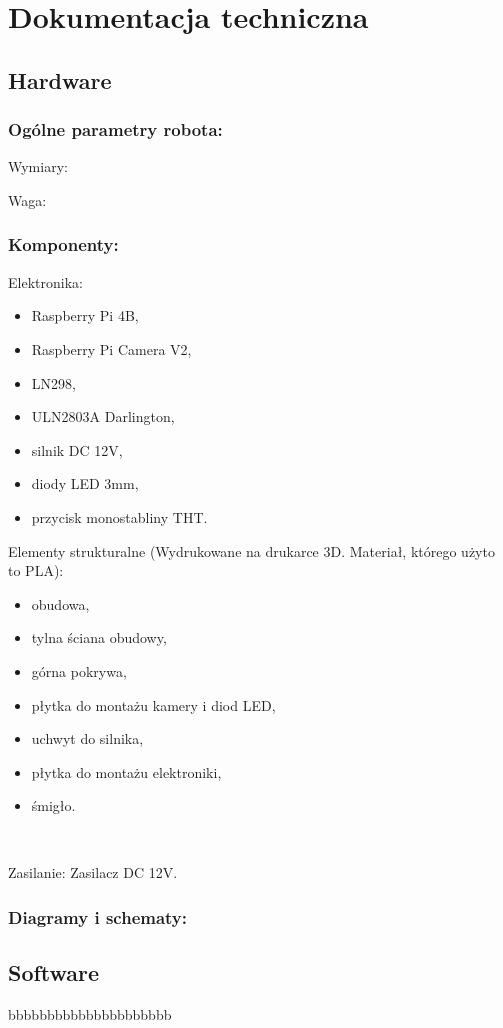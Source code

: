 \section{Dokumentacja techniczna}
\subsection{Hardware}
\subsubsection{Ogólne parametry robota:}
Wymiary: 

Waga:

\subsubsection{Komponenty:}
Elektronika:
    \begin{itemize}
        \item Raspberry Pi 4B,
        \item Raspberry Pi Camera V2,
        \item LN298,
        \item ULN2803A Darlington,
        \item silnik DC 12V,
        \item diody LED 3mm,
        \item przycisk monostabliny THT.
    \end{itemize}

Elementy strukturalne (Wydrukowane na drukarce 3D. Materiał, którego użyto to PLA):
    \begin{itemize}
        \item obudowa,
        \item tylna ściana obudowy,
        \item górna pokrywa,
        \item płytka do montażu kamery i diod LED,
        \item uchwyt do silnika,
        \item płytka do montażu elektroniki,
        \item śmigło.
    \end{itemize}\

Zasilanie:
Zasilacz DC 12V.

\subsubsection{Diagramy i schematy:}








\subsection{Software}
bbbbbbbbbbbbbbbbbbbbb